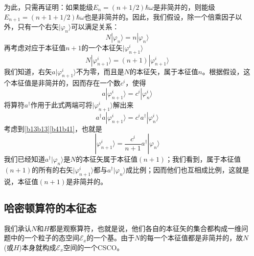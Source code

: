 \documentclass[]{article}
\begin{document}
为此，只需再证明：如果能级$E_n=(n+1/2)\hbar\omega$是非简并的，则能级$E_{n+1}=(n+1+1/2)\hbar\omega$也是非简并的。因此，我们假设，除一个倍乘因子以外，只有一个右矢$|\varphi_n\rangle$可以满足关系：
\begin{equation}
	N|\varphi_n\rangle=n|\varphi_n\rangle
\end{equation}
再考虑对应于本征值$n+1$的一个本征矢$|\varphi^i_{n+1}\rangle$
\begin{equation}
	N|\varphi^i_{n+1}\rangle=(n+1)|\varphi^i_{n+1}\rangle
	\label{b41b41}
\end{equation}
我们知道，右矢$a|\varphi^i_{n+1}\rangle$不为零，而且是$N$的本征矢，属于本征值$n$。根据假设，这个本征值是非简并的，因而存在一个数$c^i$，使得
\begin{equation}
	a|\varphi^i_{n+1}\rangle=c^i|\varphi^i_{n}\rangle
\end{equation}
将算符$a^\dagger$作用于此式两端可将$|\varphi^i_{n+1}\rangle$解出来
\begin{equation}
	a^\dagger a|\varphi^i_{n+1}\rangle=c^ia^\dagger|\varphi^i_{n}\rangle
\end{equation}
考虑到\eqref{b13b13}\eqref{b41b41}，也就是
\begin{equation}
	|\varphi^i_{n+1}\rangle=\dfrac{c^i}{n+1}a^\dagger|\varphi_n\rangle
\end{equation}
我们已经知道$a^\dagger|\varphi_n\rangle$是$N$的本征矢属于本征值$(n+1)$；我们看到，属于本征值$(n+1)$的所有的右矢$|\varphi^i_{n+1}\rangle$都与$a^\dagger|\varphi_n\rangle$成比例；因而他们也互相成比例，这就是说，本征值$(n+1)$是非简并的。\par 
\subsection{哈密顿算符的本征态}
我们承认$N$和$H$都是观察算符，也就是说，他们各自的本征矢的集合都构成一维问题中的一个粒子的态空间$\mathscr{E}_x$的一个基。由于$N$的每一个本征值都是非简并的，故$N$(或$H$)本身就构成$\mathscr{E}_x$空间的一个CSCO。
\end{document}
